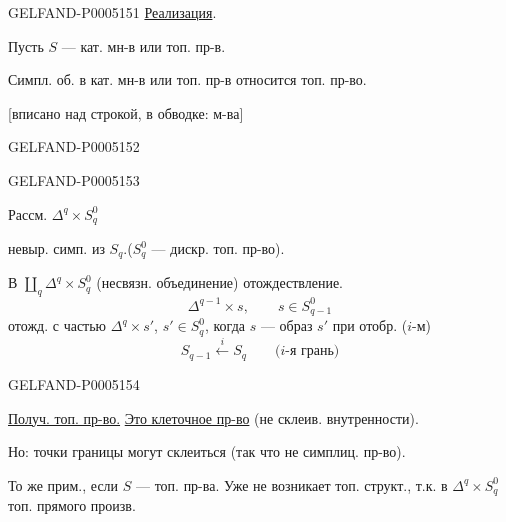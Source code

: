 \begin{GelfandAdjacentEvidence}{GELFAND-P000515}{1}
\uline{Реализация}.

Пусть $S$ — кат. мн-в или топ. пр-в.

Симпл. об. в кат. мн-в или топ. пр-в относится топ. пр-во.

 [вписано над строкой, в обводке: м-ва] 
\end{GelfandAdjacentEvidence}
\begin{GelfandAdjacentEvidence}{GELFAND-P000515}{2}



 
\end{GelfandAdjacentEvidence}
\begin{GelfandAdjacentEvidence}{GELFAND-P000515}{3}


Рассм. $\Delta^q\times S_q^0$

\hspace*{3em}невыр. симп. из $S_q$.\qquad ($S_q^0$ — дискр. топ. пр-во).

В $\coprod_q\Delta^q\times S_q^0$ (несвязн. объединение) отождествление.
\[
\Delta^{q-1}\times s,\qquad s\in S_{q-1}^0
\]
отожд. с частью $\Delta^q\times s'$, $s'\in S_q^0$,
когда $s$ — образ $s'$ при отобр. ($i$-м)
\[
S_{q-1}\overset{i}{\longleftarrow}S_q\qquad
\text{($i$-я грань)}
\]
\end{GelfandAdjacentEvidence}
\begin{GelfandAdjacentEvidence}{GELFAND-P000515}{4}


\uline{Получ. топ. пр-во.} \uline{Это клеточное пр-во} (не склеив. внутренности).

Но: точки границы могут склеиться (так что не симплиц. пр-во).

То же прим., если $S$ — топ. пр-ва. Уже не возникает топ. структ.,
т.к. в $\Delta^q\times S_q^0$ топ. прямого произв.
\end{GelfandAdjacentEvidence}
